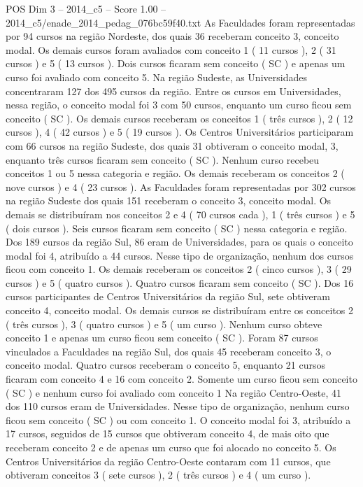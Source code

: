 \begin{textsample}{POS Dim 3 – 2014\_c5 – Score 1.00 – 2014\_c5/enade\_2014\_pedag\_076bc59f40.txt}
As Faculdades foram representadas por 94 cursos na região Nordeste, dos quais 36 receberam conceito 3, conceito modal.
Os demais cursos foram avaliados com conceito 1 ( 11 cursos ), 2 ( 31 cursos ) e 5 ( 13 cursos ).
Dois cursos ficaram sem conceito ( SC ) e apenas um curso foi avaliado com conceito 5.
Na região Sudeste, as Universidades concentraram 127 dos 495 cursos da região.
Entre os cursos em Universidades, nessa região, o conceito modal foi 3 com 50 cursos, enquanto um curso ficou sem conceito ( SC ).
Os demais cursos receberam os conceitos 1 ( três cursos ), 2 ( 12 cursos ), 4 ( 42 cursos ) e 5 ( 19 cursos ).
Os Centros Universitários participaram com 66 cursos na região Sudeste, dos quais 31 obtiveram o conceito modal, 3, enquanto três cursos ficaram sem conceito ( SC ).
Nenhum curso recebeu conceitos 1 ou 5 nessa categoria e região.
Os demais receberam os conceitos 2 ( nove cursos ) e 4 ( 23 cursos ).
As Faculdades foram representadas por 302 cursos na região Sudeste dos quais 151 receberam o conceito 3, conceito modal.
Os demais se distribuíram nos conceitos 2 e 4 ( 70 cursos cada ), 1 ( três cursos ) e 5 ( dois cursos ).
Seis cursos ficaram sem conceito ( SC ) nessa categoria e região.
Dos 189 cursos da região Sul, 86 eram de Universidades, para os quais o conceito modal foi 4, atribuído a 44 cursos.
Nesse tipo de organização, nenhum dos cursos ficou com conceito 1.
Os demais receberam os conceitos 2 ( cinco cursos ), 3 ( 29 cursos ) e 5 ( quatro cursos ).
Quatro cursos ficaram sem conceito ( SC ).
Dos 16 cursos participantes de Centros Universitários da região Sul, sete obtiveram conceito 4, conceito modal.
Os demais cursos se distribuíram entre os conceitos 2 ( três cursos ), 3 ( quatro cursos ) e 5 ( um curso ).
Nenhum curso obteve conceito 1 e apenas um curso ficou sem conceito ( SC ).
Foram 87 cursos vinculados a Faculdades na região Sul, dos quais 45 receberam conceito 3, o conceito modal.
Quatro cursos receberam o conceito 5, enquanto 21 cursos ficaram com conceito 4 e 16 com conceito 2.
Somente um curso ficou sem conceito ( SC ) e nenhum curso foi avaliado com conceito 1 Na região Centro-Oeste, 41 dos 110 cursos eram de Universidades.
Nesse tipo de organização, nenhum curso ficou sem conceito ( SC ) ou com conceito 1.
O conceito modal foi 3, atribuído a 17 cursos, seguidos de 15 cursos que obtiveram conceito 4, de mais oito que receberam conceito 2 e de apenas um curso que foi alocado no conceito 5.
Os Centros Universitários da região Centro-Oeste contaram com 11 cursos, que obtiveram conceitos 3 ( sete cursos ), 2 ( três cursos ) e 4 ( um curso ).

\end{textsample}
